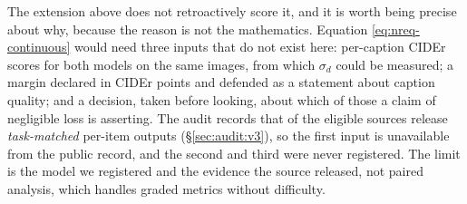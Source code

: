 The extension above does not retroactively score it, and it is worth being
precise about why, because the reason is not the mathematics. Equation
\eqref{eq:nreq-continuous} would need three inputs that do not exist here:
per-caption CIDEr scores for both models on the same images, from which
$\sigma_d$ could be measured; a margin declared in CIDEr points and defended as
a statement about caption quality; and a decision, taken before looking, about
which of those a claim of negligible loss is asserting.
The audit records that \AuditPerItemTaskMatched{} of the \AuditEligible{}
eligible sources release \emph{task-matched} per-item outputs
(\S\ref{sec:audit:v3}), so the first input is unavailable from the public
record, and the second and third were never registered.
The limit is the model we registered and the evidence the source released, not
paired analysis, which handles graded metrics without difficulty.
